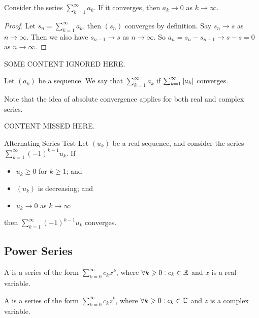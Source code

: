 \documentclass{styles/tufte}
\begin{document}
    \begin{proposition}{}{}
      Consider the series $\displaystyle \sum_{k=1}^\infty a_k$. If it converges, then $a_k \to 0$ as $k \to \infty$.
    \end{proposition}
    \begin{proof}
      Let $s_n = \displaystyle \sum_{k=1}^\infty a_k$, then $(s_n)$ converges by definition. Say $s_n \to s$ as $n \to \infty$. Then we also have $s_{n-1} \to s$ as $n \to \infty$. So $a_n = s_n - s_{n-1} \to s - s = 0$ as $n \to \infty$.
    \end{proof}
    
    SOME CONTENT IGNORED HERE.
    
    \begin{definition}{}{}
      Let $(a_k)$ be a sequence. We say that $\sum_{k=1}^\infty a_k$  if $\sum_{k=1}^\infty \abs{a_k}$ converges.
    \end{definition}
    
    Note that the idea of absolute convergence applies for both real and complex series.
    
    CONTENT MISSED HERE.
    
    \begin{theorem}{Alternating Series Test}{}
      Let $(u_k)$ be a real sequence, and consider the series $\displaystyle \sum_{k=1}^\infty (-1)^{k-1} u_k$. If
      \begin{itemize}
        \item $u_k \geqslant 0$ for $k \geqslant 1$; and
        \item $(u_k)$ is decreasing; and
        \item $u_k \to 0$ as $k \to \infty$
      \end{itemize}
      then $\displaystyle \sum_{k=1}^\infty (-1)^{k-1} u_k$ converges.
    \end{theorem}
  
  
  \subsection{Power Series}
    
    \begin{definition}{}{}
      A  is a series of the form $\displaystyle \sum_{k=0}^\infty c_k x^k$, where $\forall k \geqslant 0 : c_k \in \mathbb{R}$ and $x$ is a real variable.
    \end{definition}
    
    \begin{definition}{}{}
      A  is a series of the form $\displaystyle \sum_{k=0}^\infty c_k z^k$, where $\forall k \geqslant 0 : c_k \in \mathbb{C}$ and $z$ is a complex variable.
    \end{definition}
    
\end{document}
